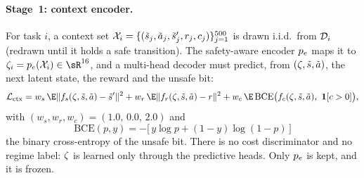 \paragraph{Stage~1: context encoder.}
For task $i$, a context set $\mathcal{X}_i=\{(\tilde s_j,\tilde a_j,\tilde s'_j,r_j,c_j)\}_{j=1}^{500}$
is drawn i.i.d.\ from $\mathcal{D}_i$ (redrawn until it holds a safe transition).  The
safety-aware encoder $p_e$ maps it to $\ctx_i=\penc(\Ctx_i)\in\sR^{16}$, and a
multi-head decoder must predict, from $(\zeta,\tilde s,\tilde a)$, the next latent
state, the reward and the unsafe bit:
\begin{equation}
  \mathcal{L}_{\mathrm{ctx}}
  = w_s\,\E\|f_s(\ctx,\tilde s,\tilde a)-\tilde s'\|^2
  + w_r\,\E\|f_r(\ctx,\tilde s,\tilde a)-r\|^2
  + w_c\,\E\,\mathrm{BCE}\big(f_c(\ctx,\tilde s,\tilde a),\ \ind[c>0]\big),
  \label{eq:copdt-ctx}
\end{equation}
with $(w_s,w_r,w_c)=(1.0,\,0.0,\,2.0)$ and
\begin{equation}
  \mathrm{BCE}(p,y) = -\big[\,y\log p + (1-y)\log(1-p)\,\big]
  \label{eq:bce}
\end{equation}
the binary cross-entropy of the unsafe bit.  There is no cost discriminator and no
regime label: $\zeta$ is learned only through the predictive heads.  Only $p_e$
is kept, and it is frozen.


